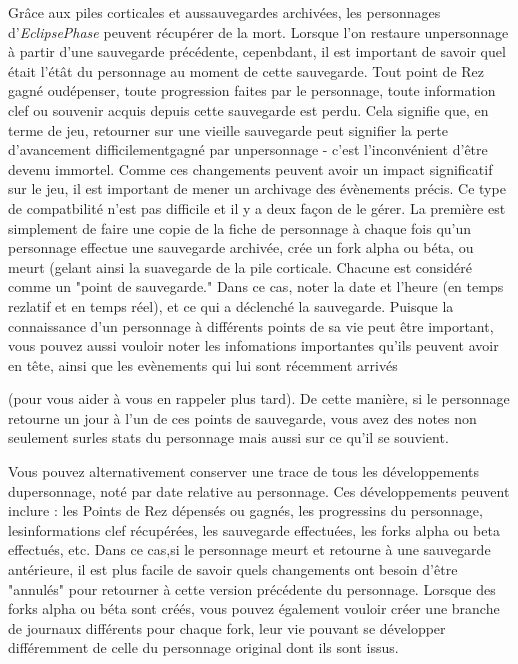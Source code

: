{Grâce aux piles corticales et aussauvegardes archivées, les personnages d'\textit{EclipsePhase} peuvent récupérer de la mort. Lorsque l'on restaure unpersonnage à partir d'une sauvegarde précédente, cepenbdant, il est important de savoir quel était l'étât du personnage au moment de cette sauvegarde. Tout point de Rez gagné oudépenser, toute progression faites par le personnage, toute information clef ou souvenir acquis depuis cette sauvegarde est perdu. Cela signifie que, en terme de jeu, retourner sur une vieille sauvegarde peut signifier la perte d'avancement difficilementgagné par unpersonnage - c'est l'inconvénient d'être devenu immortel. Comme ces changements peuvent avoir un impact significatif sur le jeu, il est important de mener un archivage des évènements précis. Ce type de compatbilité n'est pas difficile et il y a deux façon de le gérer. La première est simplement de faire une copie de la fiche de personnage à chaque fois qu'un personnage effectue une sauvegarde archivée, crée un fork alpha ou béta, ou meurt (gelant ainsi la suavegarde de la pile corticale. Chacune est considéré comme un "point de sauvegarde." Dans ce cas, noter la date et l'heure (en temps rezlatif et en temps réel), et ce qui a déclenché la sauvegarde. Puisque la connaissance d'un personnage à différents points de sa vie peut être important, vous pouvez aussi vouloir noter les infomations importantes qu'ils peuvent avoir en tête, ainsi que les evènements qui lui sont récemment arrivés 

(pour vous aider à vous en rappeler plus tard). De cette manière, si le personnage retourne un jour à l'un de ces points de sauvegarde, vous avez des notes non seulement surles stats du personnage mais aussi sur ce qu'il se souvient. 

Vous pouvez alternativement conserver une trace de tous les développements dupersonnage, noté par date relative au personnage. Ces développements peuvent inclure : les Points de Rez dépensés ou gagnés, les progressins du personnage, lesinformations clef récupérées, les sauvegarde effectuées, les forks alpha ou beta effectués, etc. Dans ce cas,si le personnage meurt et retourne à une sauvegarde antérieure, il est plus facile de savoir quels changements ont besoin d'être "annulés" pour retourner à cette version précédente du personnage. Lorsque des forks alpha ou béta sont créés, vous pouvez également vouloir créer une branche de journaux différents pour chaque fork, leur vie pouvant se développer différemment de celle du personnage original dont ils sont issus. 

}
